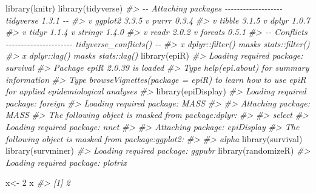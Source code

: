 \documentclass[
]{article}
\newenvironment{Shaded}{\begin{snugshade}}{\end{snugshade}}
\newcommand{\CommentTok}[1]{\textcolor[rgb]{0.56,0.35,0.01}{\textit{#1}}}
\newcommand{\DecValTok}[1]{\textcolor[rgb]{0.00,0.00,0.81}{#1}}
\newcommand{\FunctionTok}[1]{\textcolor[rgb]{0.00,0.00,0.00}{#1}}
\newcommand{\NormalTok}[1]{#1}
\newcommand{\OtherTok}[1]{\textcolor[rgb]{0.56,0.35,0.01}{#1}}
\begin{document}
\begin{Shaded}
\begin{Highlighting}[]
\FunctionTok{library}\NormalTok{(knitr)}
\FunctionTok{library}\NormalTok{(tidyverse)}
\CommentTok{\#\textgreater{} {-}{-} Attaching packages {-}{-}{-}{-}{-}{-}{-}{-}{-}{-}{-}{-}{-}{-}{-}{-}{-}{-}{-} tidyverse 1.3.1 {-}{-}}
\CommentTok{\#\textgreater{} v ggplot2 3.3.5     v purrr   0.3.4}
\CommentTok{\#\textgreater{} v tibble  3.1.5     v dplyr   1.0.7}
\CommentTok{\#\textgreater{} v tidyr   1.1.4     v stringr 1.4.0}
\CommentTok{\#\textgreater{} v readr   2.0.2     v forcats 0.5.1}
\CommentTok{\#\textgreater{} {-}{-} Conflicts {-}{-}{-}{-}{-}{-}{-}{-}{-}{-}{-}{-}{-}{-}{-}{-}{-}{-}{-}{-}{-}{-} tidyverse\_conflicts() {-}{-}}
\CommentTok{\#\textgreater{} x dplyr::filter() masks stats::filter()}
\CommentTok{\#\textgreater{} x dplyr::lag()    masks stats::lag()}
\FunctionTok{library}\NormalTok{(epiR)}
\CommentTok{\#\textgreater{} Loading required package: survival}
\CommentTok{\#\textgreater{} Package epiR 2.0.39 is loaded}
\CommentTok{\#\textgreater{} Type help(epi.about) for summary information}
\CommentTok{\#\textgreater{} Type browseVignettes(package = \textquotesingle{}epiR\textquotesingle{}) to learn how to use epiR for applied epidemiological analyses}
\CommentTok{\#\textgreater{} }
\FunctionTok{library}\NormalTok{(epiDisplay)}
\CommentTok{\#\textgreater{} Loading required package: foreign}
\CommentTok{\#\textgreater{} Loading required package: MASS}
\CommentTok{\#\textgreater{} }
\CommentTok{\#\textgreater{} Attaching package: \textquotesingle{}MASS\textquotesingle{}}
\CommentTok{\#\textgreater{} The following object is masked from \textquotesingle{}package:dplyr\textquotesingle{}:}
\CommentTok{\#\textgreater{} }
\CommentTok{\#\textgreater{}     select}
\CommentTok{\#\textgreater{} Loading required package: nnet}
\CommentTok{\#\textgreater{} }
\CommentTok{\#\textgreater{} Attaching package: \textquotesingle{}epiDisplay\textquotesingle{}}
\CommentTok{\#\textgreater{} The following object is masked from \textquotesingle{}package:ggplot2\textquotesingle{}:}
\CommentTok{\#\textgreater{} }
\CommentTok{\#\textgreater{}     alpha}
\FunctionTok{library}\NormalTok{(survival)}
\FunctionTok{library}\NormalTok{(survminer)}
\CommentTok{\#\textgreater{} Loading required package: ggpubr}
\FunctionTok{library}\NormalTok{(randomizeR)}
\CommentTok{\#\textgreater{} Loading required package: plotrix}
\end{Highlighting}
\end{Shaded}

\begin{Shaded}
\begin{Highlighting}[]
\NormalTok{x}\OtherTok{\textless{}{-}} \DecValTok{2}
\NormalTok{x}
\CommentTok{\#\textgreater{} [1] 2}
\end{Highlighting}
\end{Shaded}
\end{document}
